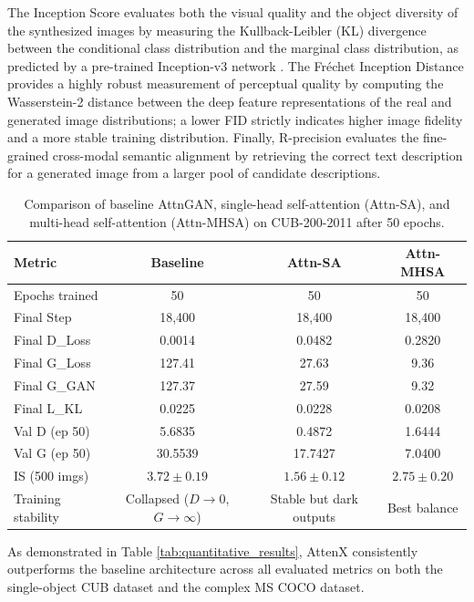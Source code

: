 \documentclass[conference]{IEEEtran}
\begin{document}
The Inception Score \cite{salimans2016improved} evaluates both the visual quality and the object diversity of the synthesized images by measuring the Kullback-Leibler (KL) divergence between the conditional class distribution and the marginal class distribution, as predicted by a pre-trained Inception-v3 network \cite{szegedy2016rethinking}. The Fr\'{e}chet Inception Distance \cite{heusel2017gans} provides a highly robust measurement of perceptual quality by computing the Wasserstein-2 distance between the deep feature representations of the real and generated image distributions; a lower FID strictly indicates higher image fidelity and a more stable training distribution. Finally, R-precision \cite{xu2018attngan} evaluates the fine-grained cross-modal semantic alignment by retrieving the correct text description for a generated image from a larger pool of candidate descriptions.
\begin{table}[t]
\centering
\caption{Comparison of baseline AttnGAN, single-head self-attention (Attn-SA), and multi-head self-attention (Attn-MHSA) on CUB-200-2011 after 50 epochs.}
\label{tab:attengan_comparison}
\begin{tabular}{lccc}
\toprule
\textbf{Metric} & \textbf{Baseline} & \textbf{Attn-SA} & \textbf{Attn-MHSA} \\
\midrule
Epochs trained & 50 & 50 & 50 \\
Final Step & 18{,}400 & 18{,}400 & 18{,}400 \\
Final D\_Loss & 0.0014 & 0.0482 & 0.2820 \\
Final G\_Loss & 127.41 & 27.63 & 9.36 \\
Final G\_GAN & 127.37 & 27.59 & 9.32 \\
Final L\_KL & 0.0225 & 0.0228 & 0.0208 \\
Val D (ep 50) & 5.6835 & 0.4872 & 1.6444 \\
Val G (ep 50) & 30.5539 & 17.7427 & 7.0400 \\
IS (500 imgs) & $3.72 \pm 0.19$ & $1.56 \pm 0.12$ & $2.75 \pm 0.20$ \\
\midrule
Training stability & Collapsed ($D \rightarrow 0$, $G \rightarrow \infty$) & Stable but dark outputs & Best balance \\
\bottomrule
\end{tabular}
\end{table}
As demonstrated in Table \ref{tab:quantitative_results}, AttenX consistently outperforms the baseline architecture across all evaluated metrics on both the single-object CUB dataset and the complex MS COCO dataset.
\end{document}
